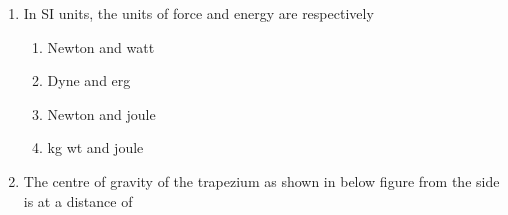 \documentclass[11pt,a4paper]{article}
\begin{document}
\begin{enumerate}
\\
\item{In SI units, the units of force and energy are respectively}
\begin{enumerate}[label=\Alph*.]
\item{Newton and watt}
\item{Dyne and erg}
\item{Newton and joule}
\item{kg wt and joule}
\end{enumerate}
\item{The centre of gravity of the trapezium as shown in below figure from the side is at a distance of  \\

}
\end{enumerate}
\end{document}
